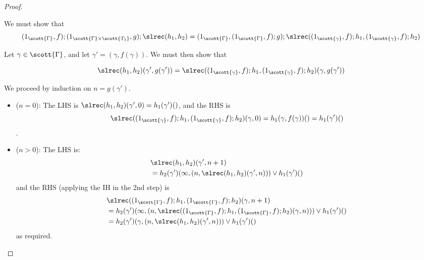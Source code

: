 \begin{proof}
\begin{itemize}
  
  We must show that 
  $$
   (1_{\scott{\Gamma}},f) ; (1_{\scott{\Gamma} \times \scott{T_1}},g) ; \slrec(h_1,h_2) = (1_{\scott{\Gamma}},(1_{\scott{\Gamma}},f);g) ; \slrec((1_{\scott{\gamma}},f) ; h_1,(1_{\scott{\gamma}},f) ; h_2)
  $$
  
  Let $\gamma \in \scott{\Gamma}$, and let $\gamma' = (\gamma,f(\gamma))$. We must then show that
  
  $$\slrec(h_1,h_2)(\gamma',g(\gamma')) = \slrec((1_{\scott{\gamma}},f) ; h_1,(1_{\scott{\gamma}},f) ; h_2)(\gamma,g(\gamma'))$$
  
  We proceed by induction on $n = g(\gamma')$.
  
  \begin{itemize}
    \item ($n = 0$): The LHS is $\slrec(h_1,h_2)(\gamma',0) = h_1(\gamma')()$, and the RHS is 
    $$\slrec((1_{\scott{\gamma}},f) ; h_1,(1_{\scott{\gamma}},f) ; h_2)(\gamma,0) = h_1(\gamma,f(\gamma))() = h_1(\gamma')()$$.
    \item ($n > 0$): The LHS is:
    \begin{align*}
      &\slrec(h_1,h_2)(\gamma',n+1)\\
      &= h_2(\gamma')(\infty,(n,\slrec(h_1,h_2)(\gamma',n))) \vee h_1(\gamma')()
    \end{align*}
    and the RHS (applying the IH in the 2nd step) is
    \begin{align*}
     &\slrec((1_{\scott{\Gamma}},f) ; h_1,(1_{\scott{\Gamma}},f) ; h_2)(\gamma,n+1)\\
     &= h_2(\gamma')(\infty,(n,\slrec((1_{\scott{\Gamma}},f) ; h_1,(1_{\scott{\Gamma}},f) ; h_2)(\gamma,n))) \vee  h_1(\gamma')()\\
     &= h_2(\gamma')(\gamma,(n,\slrec(h_1,h_2)(\gamma',n))) \vee h_1(\gamma')()
    \end{align*}
    as required.
  \end{itemize}
\end{itemize}
\end{proof}
